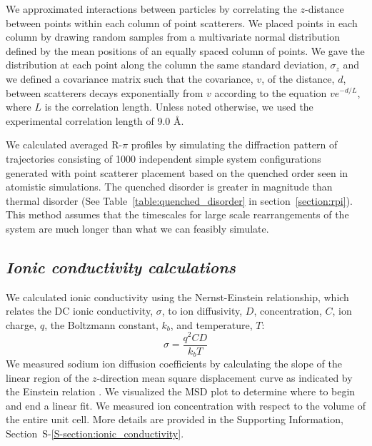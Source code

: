 \documentclass[journal=jpcbfk,manuscript=article]{achemso}
\begin{document}
  We approximated interactions between particles by correlating the $z$-distance 
  between points within each column of point scatterers. We placed points in each
  column by drawing random samples from a multivariate normal distribution defined
  by the mean positions of an equally spaced column of points. We gave the 
  distribution at each point along the column the same standard deviation, 
  $\sigma_z$ and we defined a covariance matrix such that the covariance, $v$, of
  the distance, $d$, between scatterers decays exponentially from $v$ according
  to the equation $ve^{-d/L}$, where $L$ is the correlation length. Unless noted
  otherwise, we used the experimental correlation length of 9.0 \AA. 
  
  We calculated averaged R-$\pi$ profiles by simulating the diffraction pattern
  of trajectories consisting of 1000 independent simple system configurations 
  generated with point scatterer placement based on the quenched order seen in
  atomistic simulations. The quenched disorder is greater in  magnitude than thermal 
  disorder (See Table~\ref{table:quenched_disorder} in section~\ref{section:rpi}).
  This method assumes that the timescales for large scale rearrangements of the
  system are much longer than what we can feasibly simulate.

  \subsection{\textit{Ionic conductivity calculations}}

  We calculated ionic conductivity using the Nernst-Einstein relationship, which 
  relates the DC ionic conductivity, $\sigma$, to ion diffusivity, $D$, 
  concentration, $C$, ion charge, $q$, the Boltzmann constant, $k_b$, and 
  temperature, $T$: 
  \begin{equation}
	\sigma = \dfrac{q^2CD}{k_b T} 
	\label{eqn:nernst_einstein}
  \end{equation}
  We measured sodium ion diffusion coefficients by calculating the slope
  of the linear region of the $z$-direction mean square displacement curve as
  indicated by the Einstein relation \cite{einstein_investigations_1956}. We
  visualized the MSD plot to determine where to begin and end a linear fit. We
  measured ion concentration with respect to the volume of the entire unit cell. 
  More details are provided in the Supporting Information, Section~S-\ref{S-section:ionic_conductivity}.
\end{document}

